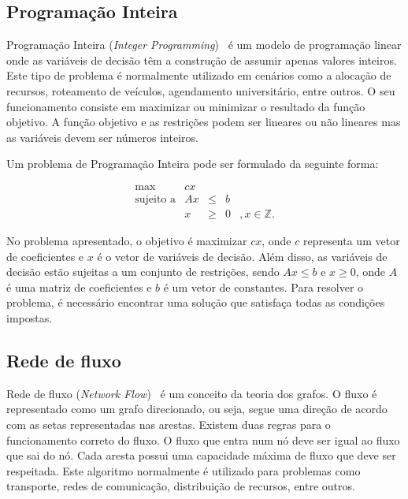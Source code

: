 \subsection{Programação Inteira}
\label{explic:integer-programming}

Programação Inteira (\textit{Integer Programming})~\cite{IntegerProgramming-Conforti-2014} é um modelo de programação linear onde as variáveis de decisão têm a construção de assumir apenas valores inteiros. Este tipo de problema é normalmente utilizado em cenários como a alocação de recursos, roteamento de veículos, agendamento universitário, entre outros. O seu funcionamento consiste em maximizar ou minimizar o resultado da função objetivo. A função objetivo e as restrições podem ser lineares ou não lineares mas as variáveis devem ser números inteiros.

Um problema de Programação Inteira pode ser formulado da seguinte forma:

\begin{equation}
    \begin{array}{rrccl}
        \text{max}       & cx &      &   & \\
        \text{sujeito a} & Ax & \leq & b & \\
                         & x  & \geq & 0 &, x \in \mathbb{Z}.
    \end{array}
\end{equation}

No problema apresentado, o objetivo é maximizar $cx$, onde $c$ representa um vetor de coeficientes e $x$ é o vetor de variáveis de decisão. Além disso, as variáveis de decisão estão sujeitas a um conjunto de restrições, sendo $Ax \leq b$ e $x \geq 0$, onde $A$ é uma matriz de coeficientes e $b$ é um vetor de constantes. Para resolver o problema, é necessário encontrar uma solução que satisfaça todas as condições impostas.

\subsection{Rede de fluxo}
\label{explic:network-flow}

Rede de fluxo (\textit{Network Flow})~\cite{Networkflows-Ahuja-1993} é um conceito da teoria dos grafos. O fluxo é representado como um grafo direcionado, ou seja, segue uma direção de acordo com as setas representadas nas arestas. Existem duas regras para o funcionamento correto do fluxo. O fluxo que entra num nó deve ser igual ao fluxo que sai do nó. Cada aresta possui uma capacidade máxima de fluxo que deve ser respeitada. Este algoritmo normalmente é utilizado para problemas como transporte, redes de comunicação, distribuição de recursos, entre outros.

